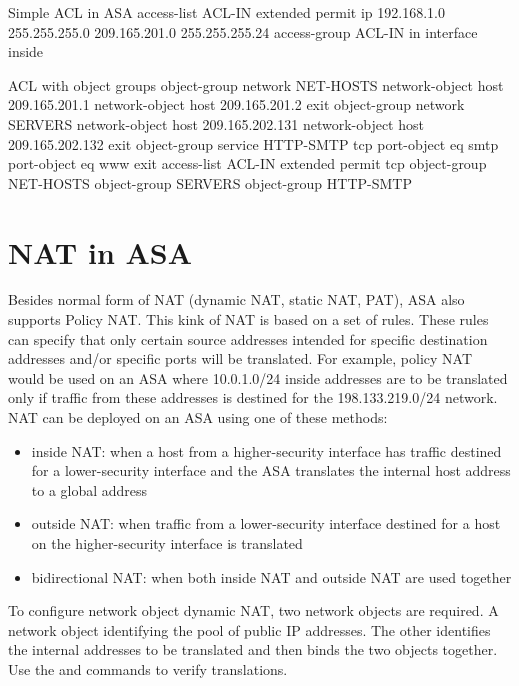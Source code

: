 \begin{sexylisting}{Simple ACL in ASA}
access-list ACL-IN extended permit ip 192.168.1.0 255.255.255.0 209.165.201.0 255.255.255.24
access-group ACL-IN in interface inside
\end{sexylisting}

\begin{sexylisting}{ACL with object groups}
object-group network NET-HOSTS
	network-object host 209.165.201.1
	network-object host 209.165.201.2
	exit
object-group network SERVERS
	network-object host 209.165.202.131
	network-object host 209.165.202.132
	exit
object-group service HTTP-SMTP tcp
	port-object eq smtp
	port-object eq www
	exit
access-list ACL-IN extended permit tcp object-group NET-HOSTS object-group SERVERS object-group HTTP-SMTP
\end{sexylisting}

\section{NAT in ASA}

Besides normal form of NAT (dynamic NAT, static NAT, PAT), ASA also supports Policy NAT. This kink of NAT is based on a set of rules. These rules can specify that only certain source addresses intended for specific destination addresses and/or specific ports will be translated. For example, policy NAT would be used on an ASA where 10.0.1.0/24 inside addresses are to be translated only if traffic from these addresses is destined for the 198.133.219.0/24 network.\\

NAT can be deployed on an ASA using one of these methods:

\begin{itemize}
\item inside NAT: when a host from a higher-security interface has traffic destined for a lower-security interface and the ASA translates the internal host address to a global address
\item outside NAT: when traffic from a lower-security interface destined for a host on the higher-security interface is translated
\item bidirectional NAT: when both inside NAT and outside NAT are used together
\end{itemize}

To configure network object dynamic NAT, two network objects are required. A network object identifying the pool of public IP addresses. The other identifies the internal addresses to be translated and then binds the two objects together. Use the  and  commands to verify translations.\\

